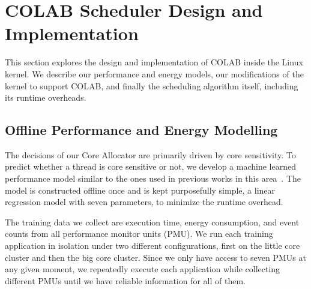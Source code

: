\section{COLAB Scheduler Design and Implementation}
This section explores the design and implementation of COLAB inside the Linux kernel. We describe our performance and energy models, our modifications of the kernel to support COLAB, and finally the scheduling algorithm itself, including its runtime overheads.

\subsection{Offline Performance and Energy Modelling}
The decisions of our Core Allocator are primarily driven by core sensitivity. To predict whether a thread is core sensitive or not, we develop a machine learned performance model similar to the ones used in previous works in this area~\cite{van2013fairness,jibaja2016portable,saez2012leveraging}. The model is constructed offline once and is kept purposefully simple, a linear regression model with seven parameters, to minimize the runtime overhead. 



The training data we collect are execution time, energy consumption, and event counts from all performance monitor units (PMU). We run each training application in isolation under two different configurations, first on the little core cluster and then the big core cluster. Since we only have access to seven PMUs at any given moment, we repeatedly execute each application while collecting different PMUs until we have reliable information for all of them.


